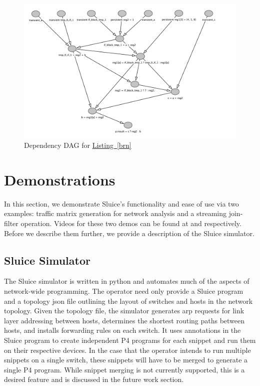 \documentclass[12pt, oneside]{article}
\newcommand{\irref}[2]{\hyperref[#2]{#1~\ref{#2}}}
\begin{document}
\begin{figure}
\centering
\includegraphics[width=175mm,scale=1]{figures/dependency_dag.pdf}
\caption{Dependency DAG for \irref{Listing}{brn} }\label{dag}
\end{figure}

 

\newpage
\section{Demonstrations} 
In this section, we demonstrate Sluice's functionality and ease of use via two examples: traffic matrix generation for network analysis and a streaming join-filter operation. Videos for these two demos can be found at \cite{traf} and \cite{stream} respectively. Before we describe them further, we provide a description of the Sluice simulator.

\subsection{Sluice Simulator}
The Sluice simulator is written in python and automates much of the aspects of network-wide programming. The operator need only provide a Sluice program and a topology json file outlining the layout of switches and hosts in the network topology. Given the topology file, the simulator generates arp requests for link layer addressing between hosts, determines the shortest routing paths between hosts, and installs forwarding rules on each switch. It uses annotations in the Sluice program to create independent P4 programs for each snippet and run them on their respective devices. In the case that the operator intends to run multiple snippets on a single switch, these snippets will have to be merged to generate a single P4 program. While snippet merging is not currently supported, this is a desired feature and is discussed in the future work section. 
\end{document}
